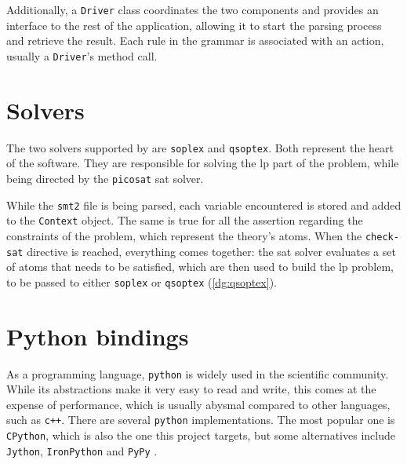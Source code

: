 Additionally, a \texttt{Driver} class coordinates the two components and provides an interface to the rest of the application, allowing it to start the parsing process and retrieve the result.
Each rule in the grammar is associated with an action, usually a \texttt{Driver}'s method call.





\section{Solvers}

The two solvers supported by \dlinear are \texttt{soplex} and \texttt{qsoptex}.
Both represent the heart of the software.
They are responsible for solving the \gls{lp} part of the problem, while being directed by the \texttt{picosat} \gls{sat} solver.

While the \texttt{smt2} file is being parsed, each variable encountered is stored and added to the \texttt{Context} object.
The same is true for all the assertion regarding the constraints of the problem, which represent the theory's atoms.
When the \texttt{check-sat} directive is reached, everything comes together: the \gls{sat} solver evaluates a set of atoms that needs to be satisfied, which are then used to build the \gls{lp} problem, to be passed to either \texttt{soplex} or \texttt{qsoptex} (\autoref{dg:qsoptex}).


\section{Python bindings}

As a programming language, \texttt{python} is widely used in the scientific community.
While its abstractions make it very easy to read and write, this comes at the expense of performance, which is usually abysmal compared to other languages, such as \texttt{c++}.
There are several \texttt{python} implementations.
The most popular one is \texttt{CPython}, which is also the one this project targets, but some alternatives include \texttt{Jython}, \texttt{IronPython} and \texttt{PyPy} \cite{man:python-implementations}.

